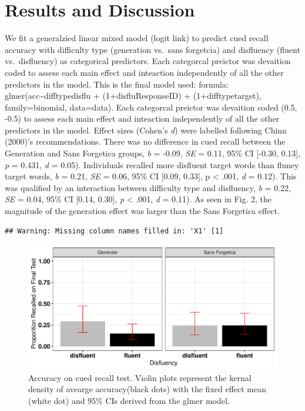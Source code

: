 \documentclass[english,doc]{apa6}
\begin{document}
\hypertarget{results-and-discussion}{%
\section{Results and Discussion}\label{results-and-discussion}}

We fit a generalzied linear mixed model (logit link) to predict cued recall accuracy with difficulty type (generation vs.~sans forgetcia) and disfluency (fluent vs.~disfluency) as categorical predictors. Each categorcal preictor was devaition coded to assess each main effect and inteaction independently of all the other predictors in the model. This is the final model used: formula: glmer(acc\textasciitilde{}difftypedisflu + (1+disflu\textbar{}ResponseID) + (1+difftype\textbar{}target), family=binomial, data=data). Each categorcal preictor was devaition coded (0.5, -0.5) to assess each main effect and inteaction independently of all the other predictors in the model. Effect sizes (Cohen's \emph{d}) were labelled following Chinn (2000)'s recommendations. There was no difference in cued recall between the Generation and Sans Forgetica groups, \emph{b} = -0.09, \emph{SE} = 0.11, 95\% CI {[}-0.30, 0.13{]}, \emph{p} = 0.431, \emph{d} = 0.05). Individuals recalled more disfluent target words than fluney target words, \emph{b} = 0.21, \emph{SE} = 0.06, 95\% CI {[}0.09, 0.33{]}, p \textless{} .001, \emph{d} = 0.12). This was qualified by an interaction between difficulty type and disfluency, \emph{b} = 0.22, \emph{SE} = 0.04, 95\% CI {[}0.14, 0.30{]}, \emph{p} \textless{} .001, \emph{d} = 0.11). As seen in Fig. 2, the magnitude of the generation effect was larger than the Sans Forgetica effect.

\begin{verbatim}
## Warning: Missing column names filled in: 'X1' [1]
\end{verbatim}

\begin{figure}

{\centering \includegraphics{SF_Paper_files/figure-latex/unnamed-chunk-2-1} 

}

\caption{Accuracy on cued recall test. Violin plots represent the kernal density of avearge accuracy(black dots) with the fixed effect mean (white dot) and 95\% CIs derived from the glmer model.}\label{fig:unnamed-chunk-2}
\end{figure}
\end{document}
